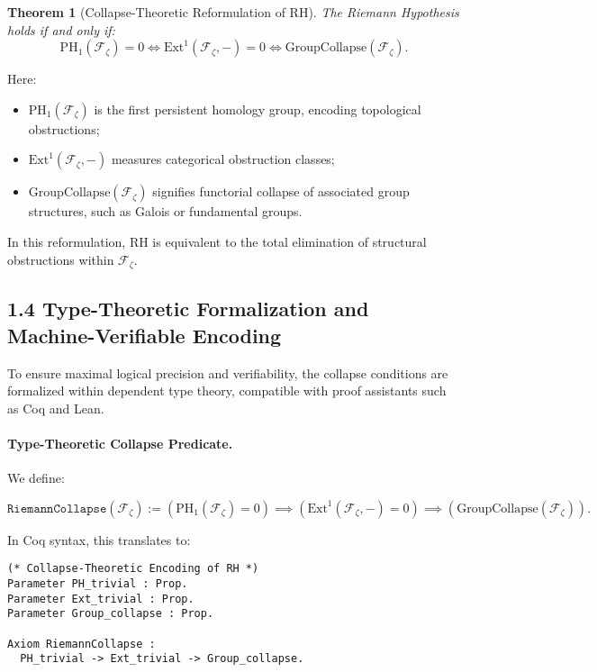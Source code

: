 \documentclass[11pt]{article}
\newtheorem{theorem}{Theorem}[section]
\begin{document}
\begin{theorem}[Collapse-Theoretic Reformulation of RH]
The Riemann Hypothesis holds if and only if:
\[
\mathrm{PH}_1(\mathcal{F}_{\zeta}) = 0 \iff \mathrm{Ext}^1(\mathcal{F}_{\zeta}, -) = 0 \iff \mathrm{GroupCollapse}(\mathcal{F}_{\zeta}).
\]
\end{theorem}

Here:

\begin{itemize}
    \item $\mathrm{PH}_1(\mathcal{F}_{\zeta})$ is the first persistent homology group, encoding topological obstructions;
    \item $\mathrm{Ext}^1(\mathcal{F}_{\zeta}, -)$ measures categorical obstruction classes;
    \item $\mathrm{GroupCollapse}(\mathcal{F}_{\zeta})$ signifies functorial collapse of associated group structures, such as Galois or fundamental groups.
\end{itemize}

In this reformulation, RH is equivalent to the total elimination of structural obstructions within $\mathcal{F}_{\zeta}$.

\subsection*{1.4 Type-Theoretic Formalization and Machine-Verifiable Encoding}

To ensure maximal logical precision and verifiability, the collapse conditions are formalized within dependent type theory, compatible with proof assistants such as Coq and Lean.

\paragraph{Type-Theoretic Collapse Predicate.}  
We define:

\[
\texttt{RiemannCollapse}(\mathcal{F}_{\zeta}) := \left( \mathrm{PH}_1(\mathcal{F}_{\zeta}) = 0 \right) \implies \left( \mathrm{Ext}^1(\mathcal{F}_{\zeta}, -) = 0 \right) \implies \left( \mathrm{GroupCollapse}(\mathcal{F}_{\zeta}) \right).
\]

In Coq syntax, this translates to:

\begin{lstlisting}[language=Coq]
(* Collapse-Theoretic Encoding of RH *)
Parameter PH_trivial : Prop.
Parameter Ext_trivial : Prop.
Parameter Group_collapse : Prop.

Axiom RiemannCollapse :
  PH_trivial -> Ext_trivial -> Group_collapse.
\end{lstlisting}
\end{document}
